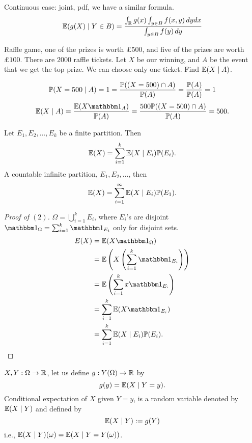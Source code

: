 \documentclass[10pt, a4paper]{article}
\begin{document}
Continuous case:
joint,
pdf,
we have a similar formula.
\[
\E(g(X) \mid Y \in B) = \frac{\int_{\R}g(x)\int_{y \in B}f(x, y)\,dydx}{\int_{y \in B}f(y)\,dy}
\]

\begin{example}
    Raffle game,
    one of the prizes is worth $\pounds 500$,
    and five of the prizes are worth $\pounds 100$.
    There are $2000$ raffle tickets.
    Let $X$ be our winning,
    and $A$ be the event that we get the top prize.
    We can choose only one ticket.
    Find $\E(X \mid A)$.

    \[
    \P(X = 500\mid A) = 1 = \frac{\P((X = 500) \cap A)}{\P(A)} = \frac{\P(A)}{\P(A)} = 1
    \]
    \[
    \E(X\mid A) = \frac{\E(X\ind)}{\P(A)} = \frac{500\P((X = 500) \cap A)}{\P(A)} = 500.
    \]
\end{example}

\begin{theorem}
    Let $E_1, E_2, \dotsc, E_k$ be a finite partition.
    Then
    \begin{equation}
        \E(X) = \sum_{i = 1}^{k}\E(X \mid E_i)\P(E_i).
    \end{equation}
    A countable infinite partition,
    $E_1, E_2, \dotsc$,
    then
    \[
    \E(X) = \sum_{i = 1}^{\infty}\E(X \mid E_i)\P(E_1).
    \]
    \begin{proof}[Proof of $(2)$]
        $\Omega = \bigcup_{i = 1}^{k}E_i$,
        where $E_i$'s are disjoint
        $\ind[\Omega] = \sum_{i = 1}^{k}\ind[E_i]$ only for disjoint sets.
        \begin{align*}
            E(X) &= \E(X\ind[\Omega]) \\
            &= \E\left(X\left(\sum_{i = 1}^{k}\ind[E_i]\right)\right) \\
            &= \E\left(\sum_{i = 1}^{k}x\ind[E_i]\right) \\
            &= \sum_{i = 1}^{k}\E(X\ind[E_i]) \\
            &= \sum_{i = 1}^{k}\E(X \mid E_i)\P(E_i).
        \end{align*}
    \end{proof}
\end{theorem}

\begin{definition}
    $X, Y : \Omega \rightarrow \R$,
    let us define $g : Y(\Omega) \rightarrow \R$ by
    \[
    g(y) = \E(X\mid Y = y).
    \]
    Conditional expectation of $X$ given $Y = y$,
    is a random variable denoted by $\E(X \mid Y)$ and defined by
    \[
    \E(X \mid Y) := g(Y)
    \]
    i.e.,
    $\E(X \mid Y)(\omega) = \E(X \mid Y = Y(\omega))$.
\end{definition}
\end{document}
